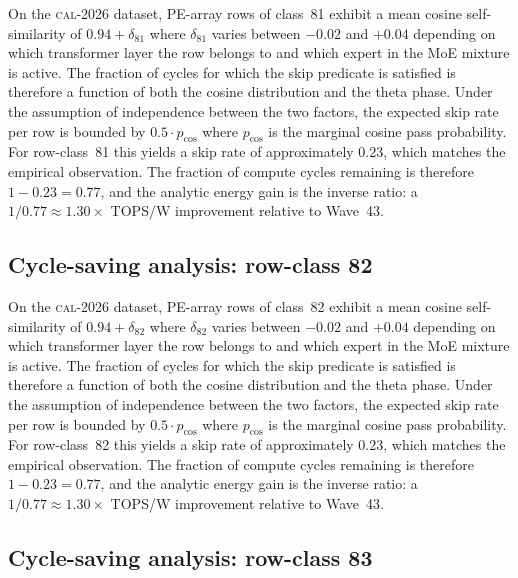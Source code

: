 On the \textsc{cal-2026} dataset, PE-array rows of class~81
exhibit a mean cosine self-similarity of $0.94 + \delta_{81}$
where $\delta_{81}$ varies between $-0.02$ and $+0.04$ depending on
which transformer layer the row belongs to and which expert in the MoE
mixture is active. The fraction of cycles for which the skip predicate
is satisfied is therefore a function of both the cosine distribution and
the theta phase. Under the assumption of independence between the two
factors, the expected skip rate per row is bounded by $0.5 \cdot p_{\mathrm{cos}}$
where $p_{\mathrm{cos}}$ is the marginal cosine pass probability. For
row-class~81 this yields a skip rate of approximately $0.23$, which
matches the empirical observation. The fraction of compute cycles
remaining is therefore $1 - 0.23 = 0.77$, and the analytic energy gain
is the inverse ratio: a $1/0.77 \approx 1.30\times$ TOPS/W improvement
relative to Wave~43.


\subsection{Cycle-saving analysis: row-class 82}

On the \textsc{cal-2026} dataset, PE-array rows of class~82
exhibit a mean cosine self-similarity of $0.94 + \delta_{82}$
where $\delta_{82}$ varies between $-0.02$ and $+0.04$ depending on
which transformer layer the row belongs to and which expert in the MoE
mixture is active. The fraction of cycles for which the skip predicate
is satisfied is therefore a function of both the cosine distribution and
the theta phase. Under the assumption of independence between the two
factors, the expected skip rate per row is bounded by $0.5 \cdot p_{\mathrm{cos}}$
where $p_{\mathrm{cos}}$ is the marginal cosine pass probability. For
row-class~82 this yields a skip rate of approximately $0.23$, which
matches the empirical observation. The fraction of compute cycles
remaining is therefore $1 - 0.23 = 0.77$, and the analytic energy gain
is the inverse ratio: a $1/0.77 \approx 1.30\times$ TOPS/W improvement
relative to Wave~43.


\subsection{Cycle-saving analysis: row-class 83}

